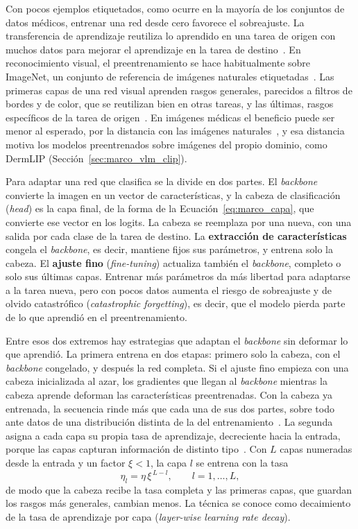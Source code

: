 Con pocos ejemplos etiquetados, como ocurre en la mayoría de los conjuntos de datos médicos, entrenar una red
desde cero favorece el sobreajuste. La transferencia de aprendizaje reutiliza lo aprendido en una tarea de
origen con muchos datos para mejorar el aprendizaje en la tarea de destino~\cite{pan2010survey}. En
reconocimiento visual, el preentrenamiento se hace habitualmente sobre ImageNet, un conjunto de referencia de
imágenes naturales etiquetadas~\cite{russakovsky2015imagenet,raghu2019transfusion}. Las primeras capas de una
red visual aprenden rasgos generales, parecidos a filtros de bordes y de color, que se reutilizan bien en otras
tareas, y las últimas, rasgos específicos de la tarea de origen~\cite{yosinski2014transferable}. En imágenes
médicas el beneficio puede ser menor al esperado, por la distancia con las imágenes
naturales~\cite{raghu2019transfusion}, y esa distancia motiva los modelos preentrenados sobre imágenes del
propio dominio, como DermLIP (Sección~\ref{sec:marco_vlm_clip}).

Para adaptar una red que clasifica se la divide en dos partes. El \emph{backbone} convierte la imagen en un
vector de características, y la cabeza de clasificación (\emph{head}) es la capa final, de la forma de la
Ecuación~\ref{eq:marco_capa}, que convierte ese vector en los logits. La cabeza se reemplaza por una nueva, con
una salida por cada clase de la tarea de destino. La \textbf{extracción de características} congela el
\emph{backbone}, es decir, mantiene fijos sus parámetros, y entrena solo la cabeza. El \textbf{ajuste fino}
(\emph{fine-tuning}) actualiza también el \emph{backbone}, completo o solo sus últimas capas. Entrenar más
parámetros da más libertad para adaptarse a la tarea nueva, pero con pocos datos aumenta el riesgo de
sobreajuste y de olvido catastrófico (\emph{catastrophic forgetting}), es decir, que el modelo pierda parte de
lo que aprendió en el preentrenamiento.

Entre esos dos extremos hay estrategias que adaptan el \emph{backbone} sin deformar lo que aprendió. La primera
entrena en dos etapas: primero solo la cabeza, con el \emph{backbone} congelado, y después la red completa. Si
el ajuste fino empieza con una cabeza inicializada al azar, los gradientes que llegan al \emph{backbone}
mientras la cabeza aprende deforman las características preentrenadas. Con la cabeza ya entrenada, la
secuencia rinde más que cada una de sus dos partes, sobre todo ante datos de una distribución distinta de la
del entrenamiento~\cite{kumar2022finetuning}. La segunda asigna a cada capa su propia tasa de aprendizaje,
decreciente hacia la entrada, porque las capas capturan información de distinto tipo~\cite{howard2018universal}.
Con $L$ capas numeradas desde la entrada y un factor $\xi < 1$, la capa $l$ se entrena con la tasa
\begin{equation}
    \eta_l = \eta \, \xi^{\,L-l}, \qquad l = 1, \dots, L,
    \label{eq:marco_llrd}
\end{equation}
de modo que la cabeza recibe la tasa completa y las primeras capas, que guardan los rasgos más generales,
cambian menos. La técnica se conoce como decaimiento de la tasa de aprendizaje por capa (\emph{layer-wise
learning rate decay}).

